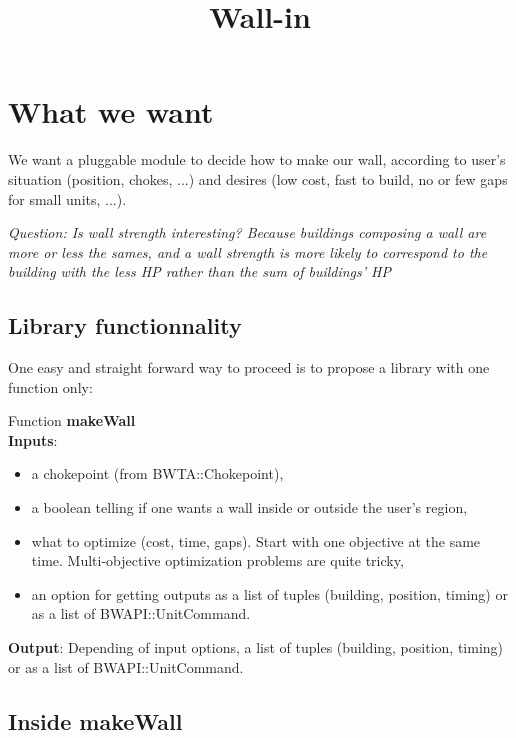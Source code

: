 \documentclass[a4paper,11pt]{article}
\begin{document}
  
\title{Wall-in}
\author{}

\maketitle



\section{What we want}

We want a  pluggable module to decide how to  make our wall, according
to  user's situation (position,  chokes, ...)  and desires  (low cost,
fast to build, no or few gaps for small units, ...).

{\it  Question:  Is   wall  strength  interesting?  Because  buildings
  composing a wall are more or  less the sames, and a wall strength is
  more likely  to correspond to the  building with the  less HP rather
  than the sum of buildings' HP}

\subsection{Library functionnality}

One easy and  straight forward way to proceed is  to propose a library
with one function only:

\noindent
Function {\bf makeWall}\\
{\bf Inputs}:
\begin{itemize}
\item a chokepoint (from BWTA::Chokepoint), 
\item a  boolean telling  if one  wants a wall  inside or  outside the
  user's region,
\item what to  optimize (cost, time, gaps).  Start  with one objective
  at the  same time.  Multi-objective optimization problems  are quite
  tricky,
\item an  option for  getting outputs as  a list of  tuples (building,
  position, timing) or as a list of BWAPI::UnitCommand.
\end{itemize}
{\bf Output}: Depending of input options, a list of tuples (building,
position, timing) or as a list of BWAPI::UnitCommand.


\subsection{Inside makeWall}
\end{document}
